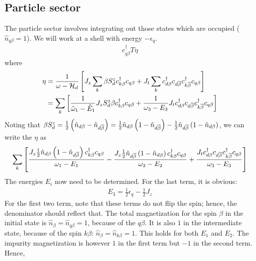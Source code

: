 \documentclass[12pt,twoside]{article}
\numberwithin{equation}{section}
\begin{document}
\subsection{Particle sector}
The particle sector involves integrating out those states which are occupied (\(\hat n_{q\beta}=1\)). We will work at a shell with energy \(-\epsilon_q\).
\begin{equation}\begin{aligned}
	c^\dagger_{q\beta}T \eta
\end{aligned}\end{equation}
where
\begin{equation}\begin{aligned}
	\label{partomega}
	\eta &= \frac{1}{\omega - \mathcal{H}_d} \left[ J_z\sum_k \beta S_d^z c^\dagger_{k\beta}c_{q\beta} + J_t \sum_k c^\dagger_{d\beta}c_{d\overline\beta} c^\dagger_{k\overline\beta}c_{q\beta} \right]\\
	     &=\sum_k \left[\frac{1}{\hat \omega_1 - \hat E_1 } J_z S_d^z \beta c^\dagger_{k\beta}c_{q\beta} + \frac{1}{\omega_3 - E_3}J_t  c^\dagger_{d\beta}c_{d\overline\beta} c^\dagger_{k\overline\beta}c_{q\beta}\right] 
\end{aligned}\end{equation}
Noting that \(\beta S_d^z = \frac{1}{2}\left( \hat n_{d\beta} - \hat n_{d\overline\beta} \right) = \frac{1}{2}\hat n_{d\beta}\left( 1 - \hat n_{d\overline\beta} \right) - \frac{1}{2}\hat n_{d\overline\beta}\left( 1 - \hat n_{d\beta} \right)\), we can write the \(\eta\) as
\begin{equation}\begin{aligned}
	     \sum_k \left[\frac{ J_z \frac{1}{2}\hat n_{d\beta}\left( 1 - \hat n_{d\overline\beta} \right) c^\dagger_{k\beta}c_{q\beta}}{\omega_1 - E_1} - \frac{J_z \frac{1}{2}\hat n_{d\overline\beta}\left( 1 - \hat n_{d\beta} \right) c^\dagger_{k\beta}c_{q\beta}}{\omega_2 - E_2} + \frac{J_t  c^\dagger_{d\beta}c_{d\overline\beta} c^\dagger_{k\overline\beta}c_{q\beta}}{\omega_3 - E_3}\right] 
\end{aligned}\end{equation}
The energies \(E_i\) now need to be determined. For the last term, it is obvious:
\begin{equation}\begin{aligned}
	E_3 = \frac{1}{2}\epsilon_q - \frac{1}{2}J_z
\end{aligned}\end{equation}
For the first two term, note that these terms do not flip the spin; hence, the denominator should reflect that. The total magnetization for the spin \(\beta\) in the initial state is \(\hat n_\beta = \hat n_{q\beta} = 1\), because of the \(q\beta\). It is also \(1\) in the intermediate state, because of the spin \(k\beta\): \(\hat n_\beta = \hat n_{k\beta} = 1\). This holds for both \(E_1\) and \(E_2\). The impurity magnetization is however \(1\) in the first term but \(-1\) in the second term. Hence,
\end{document}
